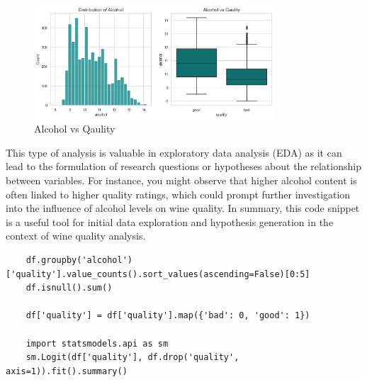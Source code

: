 \documentclass{report}
\begin{document}
\begin{figure}
    \centering
    \includegraphics[width=0.8\textwidth]{images/20.png}
    \caption{Alcohol vs Qaulity}
    \label{fig:Alcohol vs Qaulity}
\end{figure}

\pagebreak


This type of analysis is valuable in exploratory data analysis (EDA) as it can lead to the formulation of research questions or hypotheses about the relationship between variables. For instance, you might observe that higher alcohol content is often linked to higher quality ratings, which could prompt further investigation into the influence of alcohol levels on wine quality. In summary, this code snippet is a useful tool for initial data exploration and hypothesis generation in the context of wine quality analysis.

\begin{lstlisting}
    df.groupby('alcohol')['quality'].value_counts().sort_values(ascending=False)[0:5]
    df.isnull().sum()

    df['quality'] = df['quality'].map({'bad': 0, 'good': 1})

    import statsmodels.api as sm
    sm.Logit(df['quality'], df.drop('quality', axis=1)).fit().summary()
\end{lstlisting}
\end{document}
